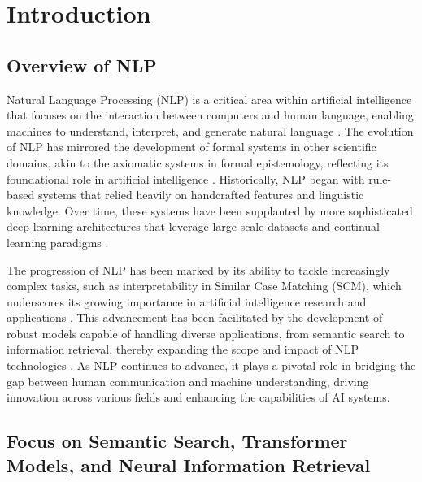 \section{Introduction} \label{sec:Introduction}


\subsection{Overview of NLP} \label{subsec:Overview of NLP}

Natural Language Processing (NLP) is a critical area within artificial intelligence that focuses on the interaction between computers and human language, enabling machines to understand, interpret, and generate natural language \cite{kaur2024cropcontextwiserobuststatic}. The evolution of NLP has mirrored the development of formal systems in other scientific domains, akin to the axiomatic systems in formal epistemology, reflecting its foundational role in artificial intelligence \cite{cieslinski2022axiomstypefreesubjectiveprobability}. Historically, NLP began with rule-based systems that relied heavily on handcrafted features and linguistic knowledge. Over time, these systems have been supplanted by more sophisticated deep learning architectures that leverage large-scale datasets and continual learning paradigms .



The progression of NLP has been marked by its ability to tackle increasingly complex tasks, such as interpretability in Similar Case Matching (SCM), which underscores its growing importance in artificial intelligence research and applications \cite{lin2023interpretabilityframeworksimilarcase}. This advancement has been facilitated by the development of robust models capable of handling diverse applications, from semantic search to information retrieval, thereby expanding the scope and impact of NLP technologies \cite{kaur2024cropcontextwiserobuststatic}. As NLP continues to advance, it plays a pivotal role in bridging the gap between human communication and machine understanding, driving innovation across various fields and enhancing the capabilities of AI systems.



\subsection{Focus on Semantic Search, Transformer Models, and Neural Information Retrieval} \label{subsec:Focus on Semantic Search, Transformer Models, and Neural Information Retrieval}

